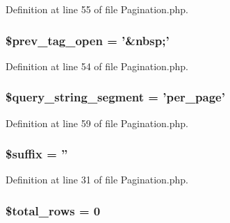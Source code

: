 Definition at line 55 of file Pagination.\-php.

\hypertarget{class_c_i___pagination_ab8f96d2bdfd51057db368d8ffd57ca5c}{
\subsubsection[{\$prev\-\_\-tag\-\_\-open}]{\setlength{\rightskip}{0pt plus 5cm}\$prev\-\_\-tag\-\_\-open = '\&nbsp;'}}\label{class_c_i___pagination_ab8f96d2bdfd51057db368d8ffd57ca5c}


Definition at line 54 of file Pagination.\-php.

\hypertarget{class_c_i___pagination_a8fe6ddd39110b4952ddcca9bba07c019}{
\subsubsection[{\$query\-\_\-string\-\_\-segment}]{\setlength{\rightskip}{0pt plus 5cm}\$query\-\_\-string\-\_\-segment = 'per\-\_\-page'}}\label{class_c_i___pagination_a8fe6ddd39110b4952ddcca9bba07c019}


Definition at line 59 of file Pagination.\-php.

\hypertarget{class_c_i___pagination_a8a4ee1ac7ecdf8ef590598ad43b23e0a}{
\subsubsection[{\$suffix}]{\setlength{\rightskip}{0pt plus 5cm}\$suffix = ''}}\label{class_c_i___pagination_a8a4ee1ac7ecdf8ef590598ad43b23e0a}


Definition at line 31 of file Pagination.\-php.

\hypertarget{class_c_i___pagination_af2c641e024ee7eeec68ae26c08ca2cf2}{
\subsubsection[{\$total\-\_\-rows}]{\setlength{\rightskip}{0pt plus 5cm}\$total\-\_\-rows = 0}}\label{class_c_i___pagination_af2c641e024ee7eeec68ae26c08ca2cf2}


